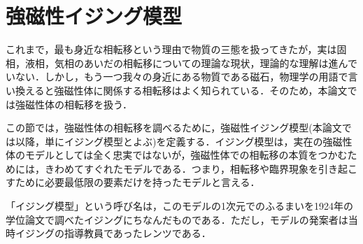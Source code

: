\documentclass[a4paper,11pt]{jsreport}
\begin{document}
\section{強磁性イジング模型}
これまで，最も身近な相転移という理由で物質の三態を扱ってきたが，実は固相，液相，気相のあいだの相転移についての理論な現状，理論的な理解は進んでいない．しかし，もう一つ我々の身近にある物質である磁石，物理学の用語で言い換えると強磁性体に関係する相転移はよく知られている．そのため，本論文では強磁性体の相転移を扱う．\par
この節では，強磁性体の相転移を調べるために，強磁性イジング模型(本論文では以降，単にイジング模型とよぶ)を定義する．イジング模型は，実在の強磁性体のモデルとしては全く忠実ではないが，強磁性体での相転移の本質をつかむためには，きわめてすぐれたモデルである．つまり，相転移や臨界現象を引き起こすために必要最低限の要素だけを持ったモデルと言える．\par
「イジング模型」という呼び名は，このモデルの1次元でのふるまいを1924年の学位論文で調べたイジングにちなんだものである．ただし，モデルの発案者は当時イジングの指導教員であったレンツである．\par
\end{document}

